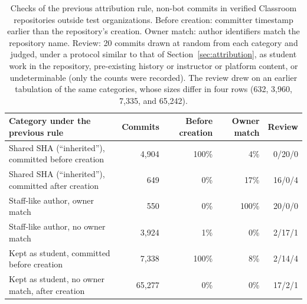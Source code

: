 \begin{table}[!htbp]
\caption{Checks of the previous attribution rule, non-bot commits in verified Classroom repositories outside test organizations. Before creation: committer timestamp earlier than the repository's creation. Owner match: author identifiers match the repository name. Review: 20 commits drawn at random from each category and judged, under a protocol similar to that of Section~\ref{sec:attribution}, as student work in the repository, pre-existing history or instructor or platform content, or undeterminable (only the counts were recorded). The review drew on an earlier tabulation of the same categories, whose sizes differ in four rows (632, 3,960, 7,335, and 65,242).}
\label{tab:activity}
\footnotesize
\setlength{\tabcolsep}{4pt}
\begin{tabular}{@{}p{5.6cm} r r r r@{}}
\toprule
Category under the previous rule & Commits & Before creation & Owner match & Review \\
\midrule
Shared SHA (``inherited''), committed before creation & 4,904 & 100\% & 4\% & 0/20/0 \\
Shared SHA (``inherited''), committed after creation & 649 & 0\% & 17\% & 16/0/4 \\
Staff-like author, owner match & 550 & 0\% & 100\% & 20/0/0 \\
Staff-like author, no owner match & 3,924 & 1\% & 0\% & 2/17/1 \\
Kept as student, committed before creation & 7,338 & 100\% & 8\% & 2/14/4 \\
Kept as student, no owner match, after creation & 65,277 & 0\% & 0\% & 17/2/1 \\
\bottomrule
\end{tabular}
\end{table}

